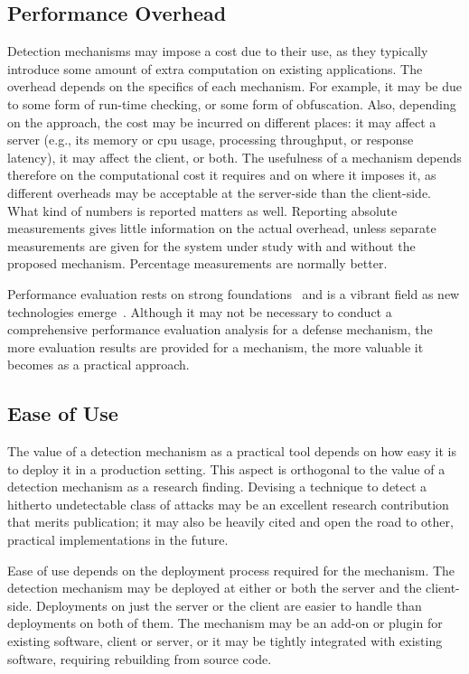 \documentclass[10pt,journal,compsoc]{IEEEtran}
\begin{document}
\subsection{Performance Overhead}

Detection mechanisms may impose a cost due to their use, as they
typically introduce some amount of extra computation on existing applications.
The overhead depends on the specifics of each mechanism. For
example, it may be due to some form of run-time checking, or some form of
obfuscation. Also, depending on the approach, the cost may be incurred
on different places: it may affect a server
(e.g., its memory or {\sc cpu} usage, processing throughput, or response latency),
it may affect the client, or both. The
usefulness of a mechanism depends therefore on the
computational cost it requires and on where it imposes it, as
different overheads may be acceptable at the server-side than the client-side.
What kind of numbers is reported matters as well. Reporting absolute
measurements gives little information on the actual overhead, unless
separate measurements are given for the system under study with and
without the proposed mechanism. Percentage measurements are normally
better. 

Performance evaluation rests on strong foundations~\cite{jain1991} and
is a vibrant field as new technologies emerge~\cite{gregg2014}.
Although it may not be necessary to conduct a comprehensive
performance evaluation analysis for a defense mechanism, the more
evaluation results are provided for a mechanism, the more valuable
it becomes as a practical approach.

\subsection{Ease of Use}
\label{sec:deployment}
\vspace{-0.5mm}

The value of a detection mechanism as a practical tool depends on how
easy it is to deploy it in a production setting. This aspect is
orthogonal to the
value of a detection mechanism as a research finding. Devising a
technique to detect a hitherto undetectable class of attacks may be an
excellent research contribution that merits publication; it may also
be heavily cited and open the road to other, practical
implementations in the future. 

Ease of use depends on the deployment process required for the
mechanism. The detection mechanism may be deployed at either or both
the server and the client-side. Deployments on just the server or the client are
easier to handle than deployments on both of them. The mechanism may
be an add-on or plugin for existing software, client or server, or it
may be tightly integrated with existing software, requiring rebuilding
from source code.
\end{document}
